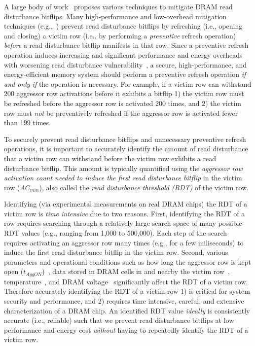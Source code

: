 A large body of work~\mitigatingRowHammerAllCitations{} proposes 
various techniques to mitigate DRAM read disturbance bitflips. 
Many high-performance and low-overhead mitigation techniques (e.g.,~\cite{jedecddr5c,olgun2024abacus,saxena2024start,
yaglikci2024spatial,bostanci2024comet,qureshi2022hydra,
canpolat2024understanding}) prevent read disturbance bitflips 
by refreshing (i.e., opening and closing) a victim row (i.e., 
by performing a \emph{preventive} refresh operation) \emph{before} 
a read disturbance bitflip manifests in that row. Since a 
preventive refresh operation induces increasing and 
significant performance and energy overheads with worsening 
read disturbance vulnerability~\cite{XYZ}, a secure, high-performance, 
and energy-efficient memory system should perform a preventive 
refresh operation \emph{if and only if} the operation is necessary. For example, 
if a victim row can withstand 200 aggressor row activations 
before it exhibits a bitflip 1) the victim row must be refreshed
before the aggressor row is activated 200 times, 
and 2) the victim row must \emph{not} be preventively refreshed if the aggressor
row is activated fewer than 199 times.

To securely prevent read disturbance bitflips and unnecessary preventive refresh operations, 
it is important to 
accurately identify {the amount of read disturbance} 
that a victim row can withstand before the victim row exhibits 
a read disturbance bitflip. 
This amount is typically quantified 
using the \emph{aggressor row activation count needed 
to induce the first read disturbance bitflip} in the 
victim row ($AC_{min}$), also called the \emph{read disturbance threshold (RDT)} 
of the victim row. 

Identifying (via experimental measurements on real DRAM chips) the RDT of a 
victim row is \emph{time intensive} due to two reasons.
First, identifying the RDT of a row requires searching through a relatively large
search space of many possible RDT values (e.g., ranging from 1,000 to 500,000). Each step of the 
search requires activating an aggressor row many times (e.g., for a few miliseconds) to induce
the first read disturbance bitflip in the victim row.
Second, various parameters and operational conditions
such as how long the aggressor row is kept open 
($t_{AggON}$)~\cite{luo2023rowpress, olgun2024read, orosa2021deeper}, 
data stored in DRAM cells in and nearby the victim row~\cite{kim2014flipping,
kim2020revisiting, olgun2024read}, temperature~\cite{orosa2024spyhammer, 
orosa2021deeper}, and DRAM voltage~\cite{yaglikci2022understanding, cohen2022hammerscope} 
significantly affect the RDT of a victim row. Therefore accurately identifying the RDT 
of a victim row 1) is critical for system security and performance, and 
2) requires time intensive, careful, and extensive 
characterization of a DRAM chip. An identified RDT value \emph{ideally} is 
consistently accurate (i.e., reliable) such that we prevent
read disturbance bitflips at low performance and energy cost \emph{without} 
having to repeatedly identify the RDT of a victim row.

